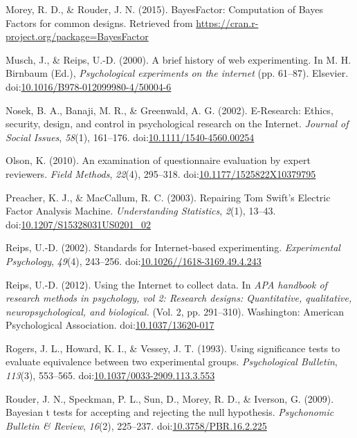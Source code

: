 \documentclass[english,man, mask]{apa6}
\theoremstyle{definition}
\theoremstyle{definition}
\theoremstyle{definition}
\theoremstyle{remark}
\begin{document}
\hypertarget{ref-Morey2015b}{}
Morey, R. D., \& Rouder, J. N. (2015). BayesFactor: Computation of Bayes
Factors for common designs. Retrieved from
\url{https://cran.r-project.org/package=BayesFactor}

\hypertarget{ref-Musch2000}{}
Musch, J., \& Reips, U.-D. (2000). A brief history of web experimenting.
In M. H. Birnbaum (Ed.), \emph{Psychological experiments on the
internet} (pp. 61--87). Elsevier.
doi:\href{https://doi.org/10.1016/B978-012099980-4/50004-6}{10.1016/B978-012099980-4/50004-6}

\hypertarget{ref-Nosek2002}{}
Nosek, B. A., Banaji, M. R., \& Greenwald, A. G. (2002). E-Research:
Ethics, security, design, and control in psychological research on the
Internet. \emph{Journal of Social Issues}, \emph{58}(1), 161--176.
doi:\href{https://doi.org/10.1111/1540-4560.00254}{10.1111/1540-4560.00254}

\hypertarget{ref-Olson2010}{}
Olson, K. (2010). An examination of questionnaire evaluation by expert
reviewers. \emph{Field Methods}, \emph{22}(4), 295--318.
doi:\href{https://doi.org/10.1177/1525822X10379795}{10.1177/1525822X10379795}

\hypertarget{ref-Preacher2003}{}
Preacher, K. J., \& MacCallum, R. C. (2003). Repairing Tom Swift's
Electric Factor Analysis Machine. \emph{Understanding Statistics},
\emph{2}(1), 13--43.
doi:\href{https://doi.org/10.1207/S15328031US0201_02}{10.1207/S15328031US0201\_02}

\hypertarget{ref-Reips2002a}{}
Reips, U.-D. (2002). Standards for Internet-based experimenting.
\emph{Experimental Psychology}, \emph{49}(4), 243--256.
doi:\href{https://doi.org/10.1026//1618-3169.49.4.243}{10.1026//1618-3169.49.4.243}

\hypertarget{ref-Reips2012}{}
Reips, U.-D. (2012). Using the Internet to collect data. In \emph{APA
handbook of research methods in psychology, vol 2: Research designs:
Quantitative, qualitative, neuropsychological, and biological.} (Vol. 2,
pp. 291--310). Washington: American Psychological Association.
doi:\href{https://doi.org/10.1037/13620-017}{10.1037/13620-017}

\hypertarget{ref-Rogers1993}{}
Rogers, J. L., Howard, K. I., \& Vessey, J. T. (1993). Using
significance tests to evaluate equivalence between two experimental
groups. \emph{Psychological Bulletin}, \emph{113}(3), 553--565.
doi:\href{https://doi.org/10.1037/0033-2909.113.3.553}{10.1037/0033-2909.113.3.553}

\hypertarget{ref-Rouder2009}{}
Rouder, J. N., Speckman, P. L., Sun, D., Morey, R. D., \& Iverson, G.
(2009). Bayesian t tests for accepting and rejecting the null
hypothesis. \emph{Psychonomic Bulletin \& Review}, \emph{16}(2),
225--237.
doi:\href{https://doi.org/10.3758/PBR.16.2.225}{10.3758/PBR.16.2.225}
\end{document}
